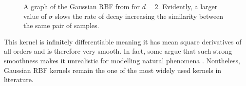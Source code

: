 \begin{figure}[H]
    \centering
    \quad
    \caption{A graph of the Gaussian RBF from  for $d=2$. Evidently, a larger value of $\sigma$ slows the rate of decay increasing the similarity between the same pair of samples.}%
    \label{fig: grbfk_graph_1}
\end{figure}

This kernel is infinitely differentiable meaning it has mean square derivatives of all orders and is therefore very smooth. In fact, some argue that such strong smoothness makes it unrealistic for modelling natural phenomena \cites{RasmussenCarlEdward2006Gpfm,SteinMichaelL1999IoSD}. Nontheless, Gaussian RBF kernels remain the one of the most widely used kernels in literature.